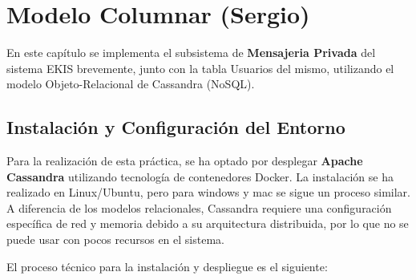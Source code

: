 
\chapter{Modelo Columnar (Sergio)}
\label{ch:sergio}

En este capítulo se implementa el subsistema de \textbf{Mensajeria Privada} del sistema EKIS brevemente, junto con la tabla Usuarios del mismo, utilizando el modelo Objeto-Relacional de Cassandra (NoSQL).

\section{Instalación y Configuración del Entorno}

Para la realización de esta práctica, se ha optado por desplegar \textbf{Apache Cassandra} utilizando tecnología de contenedores Docker. La instalación se ha realizado en Linux/Ubuntu, pero para windows y mac se sigue un proceso similar. A diferencia de los modelos relacionales, Cassandra requiere una configuración específica de red y memoria debido a su arquitectura distribuida, por lo que no se puede usar con pocos recursos en el sistema.

El proceso técnico para la instalación y despliegue es el siguiente:

